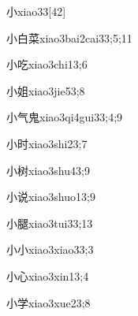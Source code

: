 \begin{verbete}{小}{xiao3}{3}[42]
\end{verbete}

\begin{verbete}{小白菜}{xiao3bai2cai3}{3;5;11}
\end{verbete}

\begin{verbete}{小吃}{xiao3chi1}{3;6}
\end{verbete}

\begin{verbete}{小姐}{xiao3jie5}{3;8}
\end{verbete}

\begin{verbete}{小气鬼}{xiao3qi4gui3}{3;4;9}
\end{verbete}

\begin{verbete}{小时}{xiao3shi2}{3;7}
\end{verbete}

\begin{verbete}{小树}{xiao3shu4}{3;9}
\end{verbete}

\begin{verbete}{小说}{xiao3shuo1}{3;9}
\end{verbete}

\begin{verbete}{小腿}{xiao3tui3}{3;13}
\end{verbete}

\begin{verbete}{小小}{xiao3xiao3}{3;3}
\end{verbete}

\begin{verbete}{小心}{xiao3xin1}{3;4}
\end{verbete}

\begin{verbete}{小学}{xiao3xue2}{3;8}
\end{verbete}


